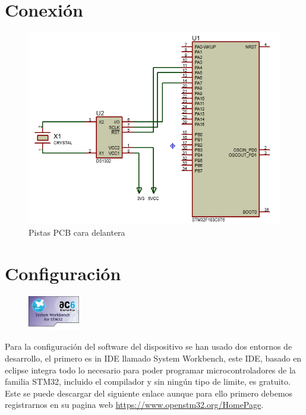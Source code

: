 \documentclass[10pt,a4paper,oneside]{article}
\begin{document}
\section*{Conexión}

\begin{figure}[H]
\centering
\includegraphics[scale=0.5]{Imagenes/DS1302_MCU_CONECTION.png}
\caption[Vista de las pistas de la cara delantera de la PCB tras el proceso de insolado]{Pistas PCB cara delantera}
\label{fig:001}
\end{figure}

\vspace{0.5cm}

\section{Configuración}

\begin{figure}
    \centering
    \includegraphics[width=0.2\textwidth]{Imagenes/SW4STM32.png}
\end{figure}

Para la configuración del software del dispositivo se han usado dos entornos de desarrollo, el primero es in IDE llamado System Workbench, este IDE, basado en eclipse integra todo lo necesario para poder programar microcontroladores de la familia STM32, incluido el compilador y sin ningún tipo de limite, es gratuito. Este se puede descargar del siguiente enlace aunque para ello primero debemos registrarnos en su pagina web \url{https://www.openstm32.org/HomePage}.
\end{document}
